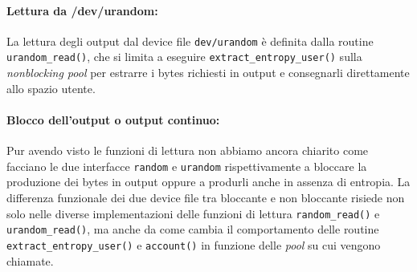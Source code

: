 \documentclass{article}
\begin{document}
 
 
 \paragraph{Lettura da /dev/urandom:} La lettura degli output dal device file
 \verb+dev/urandom+ è definita dalla routine \verb+urandom_read()+, che si
 limita a eseguire \verb+extract_entropy_user()+ sulla \emph{nonblocking pool}
 per estrarre i bytes richiesti in output e consegnarli direttamente allo spazio
 utente. 
 
 \paragraph{Blocco dell'output o output continuo:} Pur avendo visto le
 funzioni di lettura non abbiamo ancora chiarito come facciano le due interfacce
 \verb+random+ e \verb+urandom+ rispettivamente a bloccare la produzione dei
 bytes in output oppure a produrli anche in assenza di entropia. La differenza
 funzionale dei due device file tra bloccante e non bloccante risiede non solo
 nelle diverse implementazioni delle funzioni di lettura \verb+random_read()+ e
 \verb+urandom_read()+, ma anche da come cambia il comportamento delle routine
 \verb+extract_entropy_user()+ e \verb+account()+ in funzione delle \emph{pool}
 su cui vengono chiamate.
 
\end{document}
